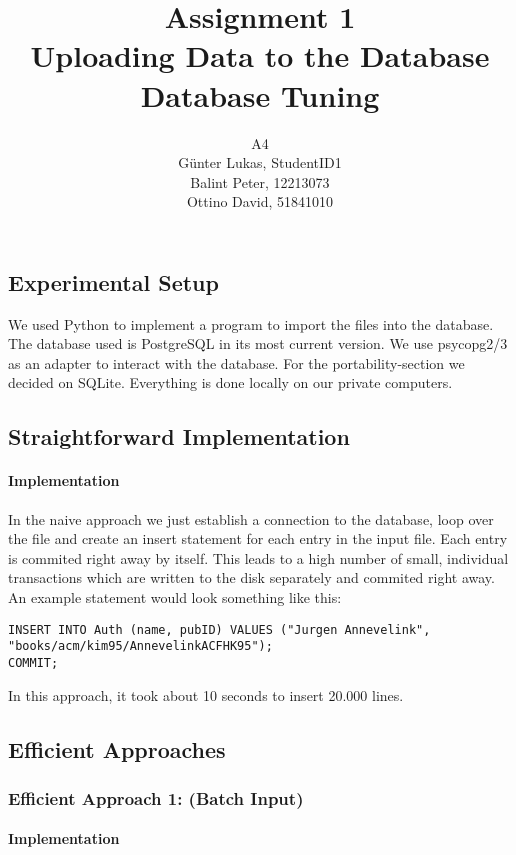 \documentclass[11pt]{scrartcl}
\title{
  \textbf{\large Assignment 1} \\
  Uploading Data to the Database \\
  {\large Database Tuning}}
\author{
  A4 \\
  \large Günter Lukas, StudentID1 \\
  \large Balint Peter, 12213073 \\
  \large Ottino David, 51841010
}
\begin{document}
\maketitle

\subsection*{Experimental Setup}

We used Python to implement a program to import the files into the database. The database used is PostgreSQL in its most current version. We use psycopg2/3 as an adapter to interact with the database. For the portability-section we decided on SQLite. Everything is done locally on our private computers.

\subsection*{Straightforward Implementation}

\paragraph{Implementation}

In the naive approach we just establish a connection to the database, loop over the file and create an insert statement for each entry in the input file. Each entry is commited right away by itself. This leads to a high number of small, individual transactions which are written to the disk separately and commited right away. An example statement would look something like this:

\begin{lstlisting}[style=dbtsql]
INSERT INTO Auth (name, pubID) VALUES ("Jurgen Annevelink", 
"books/acm/kim95/AnnevelinkACFHK95");
COMMIT;
\end{lstlisting}

In this approach, it took about 10 seconds to insert 20.000 lines.

\subsection*{Efficient Approaches}

\subsubsection*{Efficient Approach 1: (Batch Input)}

\paragraph{Implementation}
\end{document}
